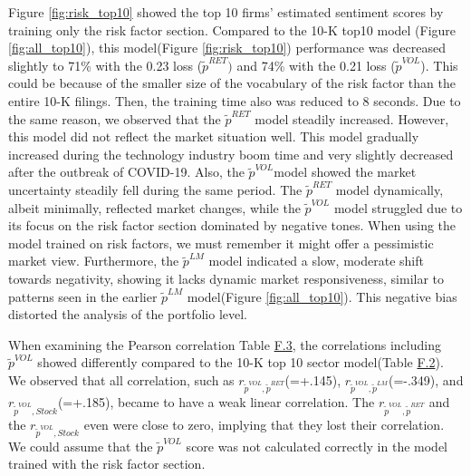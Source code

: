 \documentclass[logo,bsc,singlespacing,parskip]{infthesis}
\begin{document}
Figure \ref{fig:risk_top10} showed the top 10 firms’ estimated sentiment scores by training only the risk factor section. Compared to the 10-K top10 model (Figure \ref{fig:all_top10}), this model(Figure \ref{fig:risk_top10}) performance was decreased slightly to 71\% with the 0.23 loss ($\tilde{p}^{RET})$ and 74\% with the 0.21 loss ($\tilde{p}^{VOL}$). This could be because of the smaller size of the vocabulary of the risk factor than the entire 10-K filings. Then, the training time also was reduced to 8 seconds. Due to the same reason, we observed that the $\tilde{p}^{RET}$ model steadily increased. However, this model did not reflect the market situation well. This model gradually increased during the technology industry boom time and very slightly decreased after the outbreak of COVID-19. Also, the $\tilde{p}^{VOL}$model showed the market uncertainty steadily fell during the same period. The $\tilde{p}^{RET}$ model dynamically, albeit minimally, reflected market changes, while the $\tilde{p}^{VOL}$ model struggled due to its focus on the risk factor section dominated by negative tones. When using the model trained on risk factors, we must remember it might offer a pessimistic market view. Furthermore, the $\tilde{p}^{LM}$ model indicated a slow, moderate shift towards negativity, showing it lacks dynamic market responsiveness, similar to patterns seen in the earlier $\tilde{p}^{LM}$ model(Figure \ref{fig:all_top10}). This negative bias distorted the analysis of the portfolio level.

When examining the Pearson correlation Table \hyperref[tab:risk_top10_corr]{F.3}, the correlations including $\tilde{p}^{VOL}$ showed differently compared to the 10-K top 10 sector model(Table \hyperref[tab:all_top10_corr]{F.2}). We observed that all correlation, such as $r_{\tilde{p}^{VOL},\tilde{p}^{RET}}$(=+.145), $r_{\tilde{p}^{VOL},\tilde{p}^{LM}}$(=-.349), and $r_{\tilde{p}^{VOL},Stock}$(=+.185), became to have a weak linear correlation. The $r_{\tilde{p}^{VOL},\tilde{p}^{RET}}$ and the $r_{\tilde{p}^{VOL},Stock}$ even were close to zero, implying that they lost their correlation. We could assume that the $\tilde{p}^{VOL}$ score was not calculated correctly in the model trained with the risk factor section. 

\end{document}
